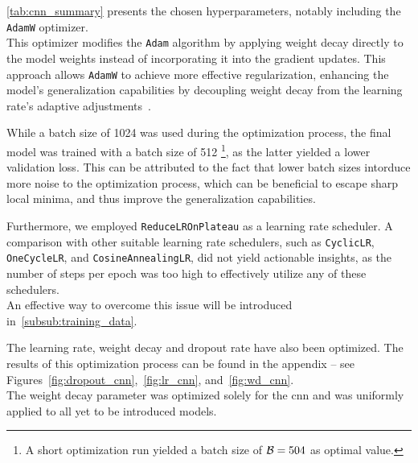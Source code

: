 \autoref{tab:cnn_summary} presents the chosen hyperparameters, notably including the \texttt{AdamW} optimizer. \\
This optimizer modifies the \texttt{Adam} algorithm by applying weight decay directly to the model weights instead of
incorporating it into the gradient updates. This approach allows \texttt{AdamW} to achieve more effective regularization,
enhancing the model's generalization capabilities by decoupling weight decay from the learning rate's adaptive adjustments~\cite{loshchilov2019decoupled}.

While a batch size of 1024 was used during the optimization process, the final model was trained with a batch size of 512%
\footnote{A short optimization run yielded a batch size of \( \mathcal{B} = 504 \) as optimal value.},
as the latter yielded a lower validation loss. This can be attributed to the fact that lower batch sizes intorduce more noise
to the optimization process, which can be beneficial to escape sharp local minima, and thus improve the generalization capabilities.

Furthermore, we employed \texttt{ReduceLROnPlateau} as a learning rate scheduler.
A comparison with other suitable
learning rate schedulers, such as \texttt{CyclicLR}, \texttt{OneCycleLR}, and
\texttt{CosineAnnealingLR}, did not yield actionable insights, as the number of steps per epoch
was too high to effectively utilize any of these schedulers. \\
An effective way to overcome this issue will be introduced in~\autoref{subsub:training_data}.

The learning rate, weight decay and dropout rate have also been optimized. The results of this optimization process can
be found in the appendix -- see Figures~\ref{fig:dropout_cnn},~\ref{fig:lr_cnn}, and~\ref{fig:wd_cnn}. \\
The weight decay parameter was optimized solely for the \gls{cnn} and was uniformly applied to all yet to be introduced
models.

\newpage{}
